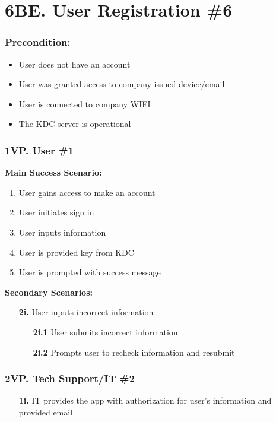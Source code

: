 \documentclass[]{article}
\begin{document}
\section*{6BE. User Registration \#6}
\subsubsection*{Precondition:}
\begin{itemize}
	\item User does not have an account
	\item User was granted access to company issued device/email
	\item User is connected to company WIFI
	\item The KDC server is operational
\end{itemize}
\subsubsection*{1VP. User \#1}
\textbf{Main Success Scenario:}
\begin{enumerate}
	\item User gains access to make an account
	\item User initiates sign in
	\item User inputs information
	\item User is provided key from KDC
	\item User is prompted with success message
\end{enumerate}
\textbf{Secondary Scenarios:}
\begin{enumerate}
	\item[\textbf{2i.}] User inputs incorrect information
		\begin{enumerate}
			\item[\textbf{2i.1}] User submits incorrect information
			\item[\textbf{2i.2}] Prompts user to recheck information and resubmit
		\end{enumerate}
\end{enumerate}
\subsubsection*{2VP. Tech Support/IT \#2}
\begin{enumerate}
	\item[\textbf{1i.}] IT provides the app with authorization for user's information and provided email
\end{enumerate}
\end{document}

